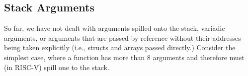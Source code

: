 \documentclass[10pt,conference]{ieeetran}%
\theoremstyle{definition}
\begin{document}



    





\subsection{Stack Arguments}

So far, we have not dealt with arguments spilled onto the stack, variadic arguments,
or arguments that are passed by reference without their addresses being taken
explicitly (i.e., structs and arrays passed directly.) Consider the simplest case,
where a function has more than 8 arguments and therefore must (in RISC-V) spill one
to the stack.
\end{document}
